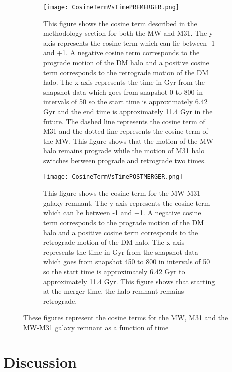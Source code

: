\documentclass[fleqn,usenatbib]{mnras}
\begin{document}
\begin{figure}
\centering
\begin{subfigure}[b]{0.5\textwidth}
    \centering
    \texttt{[image: CosineTermVsTimePREMERGER.png]}
    \caption{This figure shows the cosine term described in the methodology section for both the MW and M31. The y-axis represents the cosine term which can lie between -1 and +1. A negative cosine term corresponds to the prograde motion of the DM halo and a positive cosine term corresponds to the retrograde motion of the DM halo. The x-axis represents the time in Gyr from the snapshot data which goes from snapshot 0 to 800 in intervals of 50 so the start time is approximately 6.42 Gyr and the end time is approximately 11.4 Gyr in the future. The dashed line represents the cosine term of M31 and the dotted line represents the cosine term of the MW. This figure shows that the motion of the MW halo remains prograde while the motion of M31 halo switches between prograde and retrograde two times.}
    \label{fig:cosinePRE}
\end{subfigure}
\begin{subfigure}[b]{0.5\textwidth}              
    \centering
    \texttt{[image: CosineTermVsTimePOSTMERGER.png]}
    \caption{This figure shows the cosine term for the MW-M31 galaxy remnant. The y-axis represents the cosine term which can lie between -1 and +1. A negative cosine term corresponds to the prograde motion of the DM halo and a positive cosine term corresponds to the retrograde motion of the DM halo. The x-axis represents the time in Gyr from the snapshot data which goes from snapshot 450 to 800 in intervals of 50 so the start time is approximately 6.42 Gyr to approximately 11.4 Gyr. This figure shows that starting at the merger time, the halo remnant remains retrograde.}
    \label{fig:cosinePOST}
\end{subfigure}
\caption{These figures represent the cosine terms for the MW, M31 and the MW-M31 galaxy remnant as a function of time}
\end{figure}


\section{Discussion}
\end{document}
